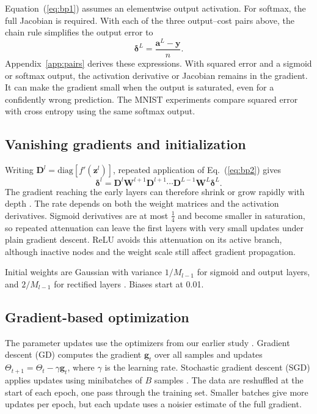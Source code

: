 \documentclass[aps,prb,reprint,superscriptaddress,nofootinbib,longbibliography,floatfix]{revtex4-2}
\newcommand{\diag}{\mathrm{diag}}
\begin{document}
Equation~(\ref{eq:bp1}) assumes an elementwise output activation. For softmax, the full Jacobian is required. With each of the three output--cost pairs above, the chain rule simplifies the output error to
\[
\bm\delta^L=\frac{\bm a^L-\bm y}{n}.
\]
Appendix~\ref{app:pairs} derives these expressions. With squared error and a sigmoid or softmax output, the activation derivative or Jacobian remains in the gradient. It can make the gradient small when the output is saturated, even for a confidently wrong prediction. The MNIST experiments compare squared error with cross entropy using the same softmax output.

\subsection{Vanishing gradients and initialization}\label{sec:init}
Writing $\bm D^l=\diag[f'(\bm z^l)]$, repeated application of Eq.~(\ref{eq:bp2}) gives
\begin{equation}
\bm\delta^l=\bm D^l\bm W^{l+1}\bm D^{l+1}\cdots
\bm D^{L-1}\bm W^L\bm\delta^L.
\label{eq:product}
\end{equation}
The gradient reaching the early layers can therefore shrink or grow rapidly with depth \cite[Sec.~8.9]{HjorthJensen2026}. The rate depends on both the weight matrices and the activation derivatives. Sigmoid derivatives are at most $\frac14$ and become smaller in saturation, so repeated attenuation can leave the first layers with very small updates under plain gradient descent. ReLU avoids this attenuation on its active branch, although inactive nodes and the weight scale still affect gradient propagation.

Initial weights are Gaussian with variance $1/M_{l-1}$ for sigmoid and output layers, and $2/M_{l-1}$ for rectified layers \cite{Glorot2010,He2015}. Biases start at 0.01.

\subsection{Gradient-based optimization}\label{sec:optimizers}
The parameter updates use the optimizers from our earlier study \cite{Ozdber2026}. Gradient descent (GD) computes the gradient $\bm g_t$ over all samples and updates $\Theta_{t+1}=\Theta_t-\gamma\bm g_t$, where $\gamma$ is the learning rate. Stochastic gradient descent (SGD) applies updates using minibatches of $B$ samples \cite[Sec.~4.7]{HjorthJensen2026}. The data are reshuffled at the start of each epoch, one pass through the training set. Smaller batches give more updates per epoch, but each update uses a noisier estimate of the full gradient.
\end{document}

